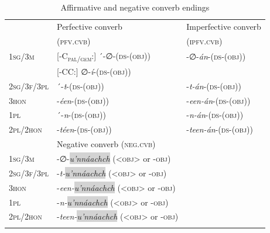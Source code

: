 \documentclass[output=paper,colorlinks,citecolor=brown,draftmode
]{langscibook}
\begin{document}
\begin{table}
\caption{Affirmative and negative converb endings}
\label{tab:treis:8}
 \begin{tabular}{lll}
  \lsptoprule
& Perfective converb & Imperfective converb\\
& (\textsc{pfv.cvb}) & (\textsc{ipfv.cvb})\\
\midrule 
\textsc{1sg/3m} & [-C\textsubscript{\textsc{pal/gem}}:] ´-∅-(\textsc{ds-(obj)}) & -∅-\textit{án}-(\textsc{ds-(obj)})\\
& [-CC:] ∅-\textit{í}-(\textsc{ds-(obj)}) & \\
\textsc{2sg/3f/3pl} & ´-\textit{t}-(\textsc{ds-(obj)}) & -\textit{t-án}-(\textsc{ds-(obj)}) \\
\textsc{3hon} & -\textit{éen}-(\textsc{ds-(obj)}) & -\textit{een-án}-(\textsc{ds-(obj)}) \\
\textsc{1pl} & ´-\textit{n}-(\textsc{ds-(obj)}) & -\textit{n-án}-(\textsc{ds-(obj)}) \\
\textsc{2pl/2hon} & -\textit{téen}-(\textsc{ds-(obj)}) & -\textit{teen-án}-(\textsc{ds-(obj)})\\
    \midrule
& Negative converb (\textsc{neg.cvb}) & \\
    \midrule
\textsc{1sg/3m} & -∅-\textit{\colorbox{lightgray}{u'nnáachch}} (<\textsc{obj}> or -\textsc{obj}) & \\
\textsc{2sg/3f/3pl} & -\textit{t-\colorbox{lightgray}{u'nnáachch}} (<\textsc{obj}> or -\textsc{obj}) & \\
\textsc{3hon} & -\textit{een-\colorbox{lightgray}{u'nnáachch}} (<\textsc{obj}> or -\textsc{obj}) & \\
\textsc{1pl} & -\textit{n-\colorbox{lightgray}{u'nnáachch}} (<\textsc{obj}> or -\textsc{obj}) & \\
\textsc{2pl/2hon} & -\textit{teen-\colorbox{lightgray}{u'nnáachch}} (<\textsc{obj}> or -\textsc{obj}) & \\
  \lspbottomrule
 \end{tabular}
\end{table}
\end{document}
